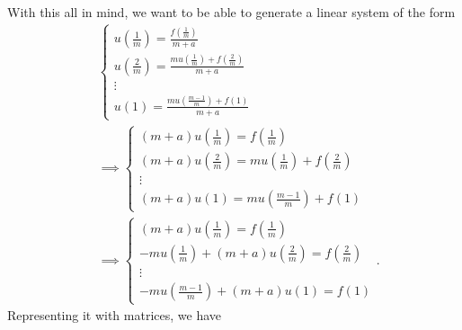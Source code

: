 \documentclass[letterpaper]{article}
\begin{document}
With this all in mind, we want to be able to generate a linear system of the form 
\begin{equation*}
    \begin{aligned}
        &\begin{cases}
            u\left(\frac{1}{m}\right) = \frac{f\left(\frac{1}{m}\right)}{m + a} \\ 
            u\left(\frac{2}{m}\right) = \frac{mu\left(\frac{1}{m}\right) + f\left(\frac{2}{m}\right)}{m + a} \\ 
            \vdots \\ 
            u(1) = \frac{mu(\frac{m - 1}{m}) + f(1)}{m + a}
        \end{cases} \\ 
        &\implies \begin{cases}
            (m + a) u\left(\frac{1}{m}\right) = f\left(\frac{1}{m}\right) \\ 
            (m + a) u\left(\frac{2}{m}\right) = mu\left(\frac{1}{m}\right) + f\left(\frac{2}{m}\right) \\ 
            \vdots \\ 
            (m + a) u(1) = mu(\frac{m - 1}{m}) + f(1)
        \end{cases} \\ 
        &\implies \begin{cases}
            (m + a) u\left(\frac{1}{m}\right) = f\left(\frac{1}{m}\right) \\ 
            -mu\left(\frac{1}{m}\right) + (m + a) u\left(\frac{2}{m}\right) = f\left(\frac{2}{m}\right) \\ 
            \vdots \\ 
            -mu(\frac{m - 1}{m}) + (m + a) u(1) = f(1)
        \end{cases}.
    \end{aligned}
\end{equation*}
Representing it with matrices, we have 
\end{document}
